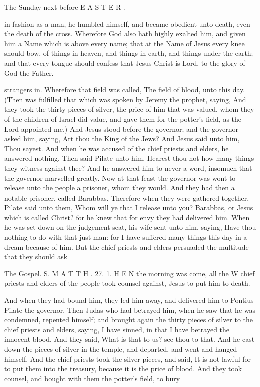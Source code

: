 The Sunday next before E A S T E R .

in fashion as a man, he humbled himself, and became obedient unto death, even the death of the cross. Wherefore God also hath highly exalted him, and given him a Name which is above every name; that at the Name of Jesus every knee should bow, of things in heaven, and things in earth, and things under the earth; and that every tongue should confess that Jesus Christ is Lord, to the glory of God the Father.

strangers in. Wherefore that field was called, The field of blood, unto this day. (Then was fulfilled that which was spoken by Jeremy the prophet, saying, And they took the thirty pieces of silver, the price of him that was valued, whom they of the children of Israel did value, and gave them for the potter’s field, as the Lord appointed me.) And Jesus stood before the governor; and the governor asked him, saying, Art thou the King of the Jews? And Jesus said unto him, Thou sayest. And when he was accused of the chief priests and elders, he answered nothing. Then said Pilate unto him, Hearest thou not how many things they witness against thee? And he answered him to never a word, insomuch that the governor marvelled greatly. Now at that feast the governor was wont to release unto the people a prisoner, whom they would. And they had then a notable prisoner, called Barabbas. Therefore when they were gathered together, Pilate said unto them, Whom will ye that I release unto you? Barabbas, or Jesus which is called Christ? for he knew that for envy they had delivered him. When he was set down on the judgement-seat, his wife sent unto him, saying, Have thou nothing to do with that just man: for I have suffered many things this day in a dream because of him. But the chief priests and elders persuaded the multitude that they should ask

The Gospel. S. M A T T H . 27. 1. H E N the morning was come, all the W chief priests and elders of the people took counsel against, Jesus to put him to death.

And when they had bound him, they led him away, and delivered him to Pontius Pilate the governor. Then Judas who had betrayed him, when he saw that he was condemned, repented himself; and brought again the thirty pieces of silver to the chief priests and elders, saying, I have sinned, in that I have betrayed the innocent blood. And they said, What is that to us? see thou to that. And he cast down the pieces of silver in the temple, and departed, and went and hanged himself. And the chief priests took the silver pieces, and said, It is not lawful for to put them into the treasury, because it is the price of blood. And they took counsel, and bought with them the potter’s field, to bury

